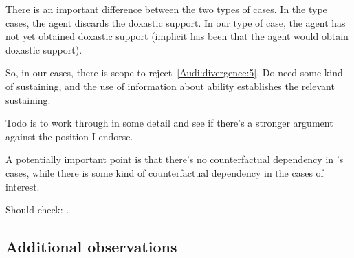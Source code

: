 \begin{note}
  There is an important difference between the two types of cases.
  In the \citeauthor{Lehrer:1971aa} type cases, the agent discards the doxastic support.
  In our type of case, the agent has not yet obtained doxastic support (implicit has been that the agent would obtain doxastic support).

  So, in our cases, there is scope to reject~\ref{Audi:divergence:5}.
  Do need some kind of sustaining, and the use of information about ability establishes the relevant sustaining.
\end{note}

\begin{note}
  Todo is to work through \citeauthor{Audi:1983ux} in some detail and see if there's a stronger argument against the position I endorse.

  A potentially important point is that there's no counterfactual dependency in \citeauthor{Lehrer:1971aa}'s cases, while there is some kind of counterfactual dependency in the cases of interest.

  Should check: \textcite{Tierney:2012tt}.
\end{note}


\subsection{Additional observations}
\label{sec:addit-observ}

